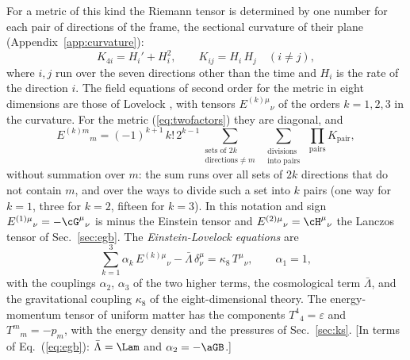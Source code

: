 For a metric of this kind the Riemann tensor is determined by one number for each pair of
directions of the frame, the sectional curvature of their plane (Appendix~\ref{app:curvature}):
\begin{equation}
K_{4i}=H_i'+H_i^{2},\qquad K_{ij}=H_i\,H_j\quad(i\ne j),
\label{eq:paircurv}
\end{equation}
where $i,j$ run over the seven directions other than the time and $H_i$ is the rate of the
direction $i$. The field equations of second order for the metric in eight dimensions are those of
Lovelock \cite{Lovelock1971}, with tensors $E^{(k)\mu}{}_{\nu}$ of the orders $k=1,2,3$ in the
curvature. For the metric (\ref{eq:twofactors}) they are diagonal, and
\begin{equation}
E^{(k)m}{}_{m}=(-1)^{k+1}\,k!\,2^{k-1}\!\!\sum_{\substack{\text{sets of }2k\\ \text{directions}\ne m}}\ \sum_{\substack{\text{divisions}\\ \text{into pairs}}}\ \prod_{\text{pairs}}K_{\text{pair}} ,
\label{eq:lovelockE}
\end{equation}
without summation over $m$: the sum runs over all sets of $2k$ directions that do not contain $m$,
and over the ways to divide such a set into $k$ pairs (one way for $k=1$, three for $k=2$, fifteen
for $k=3$). In this notation and sign $E^{(1)\mu}{}_{\nu}=-\cG^{\mu}{}_{\nu}$ is minus the Einstein
tensor and $E^{(2)\mu}{}_{\nu}=\cH^{\mu}{}_{\nu}$ the Lanczos tensor of Sec.~\ref{sec:egb}. The
\emph{Einstein-Lovelock equations} are
\begin{equation}
\sum_{k=1}^{3}\alpha_k\,E^{(k)\mu}{}_{\nu}-\bar\Lambda\,\delta^{\mu}_{\nu}=\kappa_8\,T^{\mu}{}_{\nu},\qquad\alpha_1=1,
\label{eq:EL}
\end{equation}
with the couplings $\alpha_2$, $\alpha_3$ of the two higher terms, the cosmological term
$\bar\Lambda$, and the gravitational coupling $\kappa_8$ of the eight-dimensional theory. The
energy-momentum tensor of uniform matter has the components $T^{4}{}_{4}=\varepsilon$ and
$T^{m}{}_{m}=-p_m$, with the energy density and the pressures of Sec.~\ref{sec:ks}. [In terms of
Eq.~(\ref{eq:egb}): $\bar\Lambda=\Lam$ and $\alpha_2=-\aGB$.]

